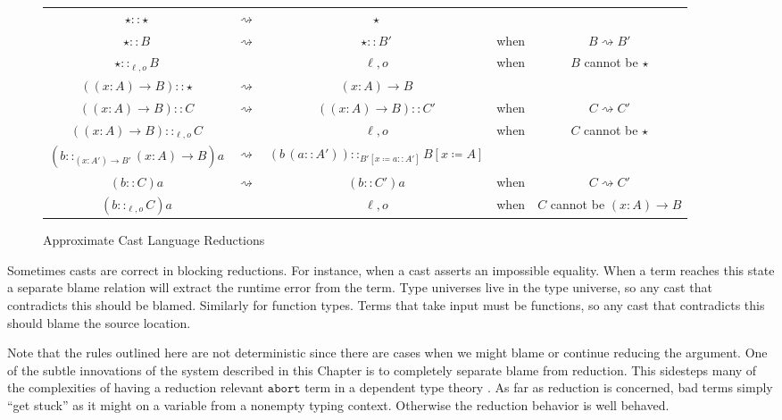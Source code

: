 \begin{sidewaysfigure}
\begin{tabular}{ccccc}
$\star::\star$ & $\rightsquigarrow$ & $\star$ &  & \tabularnewline
$\star::B$ & $\rightsquigarrow$ & $\star::B'$ & when  & $B\rightsquigarrow B'$\tabularnewline
$\star::_{\ell,o}B$ & \Blame{} & $\ell,o$ & when  & $B$ cannot be $\star$ \tabularnewline
$\left(\left(x:A\right)\rightarrow B\right)::\star$ & $\rightsquigarrow$ & $\left(x:A\right)\rightarrow B$ &  & \tabularnewline
$\left(\left(x:A\right)\rightarrow B\right)::C$ & $\rightsquigarrow$ & $\left(\left(x:A\right)\rightarrow B\right)::C'$ & when  & $C\rightsquigarrow C'$\tabularnewline
$\left(\left(x:A\right)\rightarrow B\right)::_{\ell,o}C$ & \Blame{} & $\ell,o$ & when  & $C$ cannot be $\star$ \tabularnewline
$\left(b::_{\left(x:A'\right)\rightarrow B'}\left(x:A\right)\rightarrow B\right)a$ & $\rightsquigarrow$ & $\left(b\,\left(a::A'\right)\right)::_{B'\left[x\coloneqq a::A'\right]}B\left[x\coloneqq A\right]$ &  & \tabularnewline
$\left(b::C\right)a$ & $\rightsquigarrow$ & $\left(b::C'\right)a$ & when  & $C\rightsquigarrow C'$\tabularnewline
$\left(b::_{\ell,o}C\right)a$ & \Blame{} & $\ell,o$ & when  & $C$ cannot be $\left(x:A\right)\rightarrow B$ \tabularnewline
\end{tabular}

\caption{Approximate Cast Language Reductions}
\label{fig:cast-aprox-red}
\end{sidewaysfigure}
Sometimes casts are correct in blocking reductions.
For instance, when a cast asserts an impossible equality.
When a term reaches this state a separate blame relation will extract the runtime error from the term.
Type universes live in the type universe, so any cast that contradicts this should be blamed.
Similarly for function types.
Terms that take input must be functions, so any cast that contradicts this should blame the source location.

Note that the rules outlined here are not deterministic since there are cases when we might blame or continue reducing the argument.
One of the subtle innovations of the system described in this Chapter is to completely separate blame from reduction.
This sidesteps many of the complexities of having a reduction relevant $\mathtt{abort}$ term in a dependent type theory \cite{sjoberg2012irrelevance,pedrot2018failure}.
As far as reduction is concerned, bad terms simply ``get stuck'' as it might on a variable from a nonempty typing context.
Otherwise the reduction behavior is well behaved.


